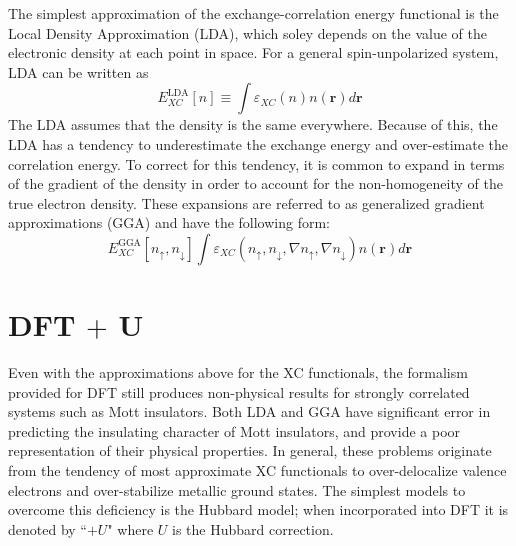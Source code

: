 \documentclass[12pt]{article}
\begin{document}
The simplest approximation of the exchange-correlation energy functional is the Local Density Approximation (LDA), which soley depends on the value of the electronic density at each point in space. For a general spin-unpolarized system, LDA can be written as 
\begin{equation*}
    E_{XC}^{\mathrm{LDA}}[n] \equiv \int \varepsilon_{XC}(n)n(\textbf{r})d\textbf{r}
\end{equation*}
The LDA assumes that the density is the same everywhere. Because of this, the LDA has a tendency to underestimate the exchange energy and over-estimate the correlation energy. To correct for this tendency, it is common to expand in terms of the gradient of the density in order to account for the non-homogeneity of the true electron density. These expansions are referred to as generalized gradient approximations (GGA) and have the following form:
\begin{equation*}
    E_{XC}^{\mathrm{GGA}}[n_{\uparrow},n_{\downarrow}]\int \varepsilon_{XC}(n_{\uparrow},n_{\downarrow},\nabla n_{\uparrow},\nabla n_{\downarrow})n(\textbf{r})d\textbf{r}
\end{equation*}

\section{DFT $+$ U} %

Even with the approximations above for the XC functionals, the formalism provided for DFT still produces non-physical results for strongly correlated systems such as Mott insulators. Both LDA and GGA have significant error in predicting the insulating character of Mott insulators, and provide a poor representation of their physical properties.  In general, these problems originate from the tendency of most approximate XC functionals to over-delocalize valence electrons and over-stabilize metallic ground states. The simplest models to overcome this deficiency is the Hubbard model; when incorporated into DFT it is denoted by ``$+U$" where $U$ is the Hubbard correction.
\end{document}
